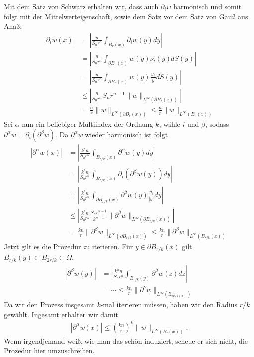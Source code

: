 \begin{solution}
Mit dem Satz von Schwarz erhalten wir, dass auch $\partial_i w$ harmonisch und
somit folgt mit der Mittelwerteigenschaft, sowie dem Satz vor dem Satz von Gauß aus Ana3:
\begin{align*}
  |\partial_iw(x)|
  &= \left|\frac{n}{S_nr^n}\int_{B_{r}(x)}\partial_iw(y) dy\right| \\
  &= \left|\frac{n}{S_nr^n}\int_{\partial B_{r}(x)}w(y)\nu_i(y) dS(y)\right| \\
  &= \left|\frac{n}{S_nr^n}\int_{\partial B_{r}(x)}w(y)\frac{y_i}{|y|} dS(y)\right| \\
  &\leq \left|\frac{n}{S_nr^n}S_nr^{n-1}\|w\|_{L^{\infty}(\partial B_{r}(x))}\right| \\
  &= \frac{n}{r}\|w\|_{L^{\infty}(\partial B_{r}(x))} \leq \frac{n}{r}\|w\|_{L^{\infty}(B_{r}(x))}
\end{align*}
Sei $\alpha$ nun ein beliebiger Multiindex der
Ordnung $k$, wähle $i$ und $\beta$, sodass
$\partial^{\alpha}w = \partial_i(\partial^{\beta}w)$. Da $\partial^{\alpha}w$
wieder harmonisch ist folgt
\begin{align*}
  |\partial^\alpha w(x)|
  &= \left|\frac{k^nn}{S_nr^n}\int_{B_{r/k}(x)}\partial^{\alpha}w(y) dy\right| \\
  &= \left|\frac{k^nn}{S_nr^n}\int_{B_{r/k}(x)}\partial_i(\partial^{\beta}w(y)) dy\right| \\
  &= \left|\frac{k^nn}{S_nr^n}\int_{\partial B_{r/k}(x)}\partial^{\beta}w(y)\frac{y_i}{|y|} dy\right| \\
  &\leq \left|\frac{k^nn}{S_nr^n}\frac{S_nr^{n-1}}{k^{n-1}}
  \|\partial^\beta w\|_{L^{\infty}(\partial B_{r/k}(x))}\right| \\
  &= \frac{kn}{r}\|\partial^\beta w\|_{L^{\infty}(\partial B_{r/k}(x))}
  \leq \frac{kn}{r}\|\partial^\beta w\|_{L^{\infty}( B_{r/k}(x))}
\end{align*}
Jetzt gilt es die Prozedur zu iterieren. Für $y \in \partial B_{r/k}(x)$
gilt $B_{r/k}(y) \subset B_{2r/k} \subset \Omega$.
\begin{align*}
  |\partial^{\beta}w(y)| &= \left|\frac{k^nn}{S_nr^n}\int_{B_{r/k}(y)}\partial^{\beta}w(z) dz\right| \\
  &= \cdots \leq \frac{kn}{r}\|\partial^{\gamma}w\|_{L^{\infty}(B_{2r/k(x)})}
\end{align*}
Da wir den Prozess insgesamt
$k$-mal iterieren müssen, haben wir den Radius $r/k$ gewählt. Ingesamt erhalten wir damit
\begin{align*}
  |\partial^{\alpha}w(x)| \leq \left(\frac{kn}{r}\right)^k\|w\|_{L^{\infty}(B_r(x))}.
\end{align*}
Wenn irgendjemand weiß, wie man das schön induziert, scheue er sich nicht,
die Prozedur hier umzuschreiben.
\end{solution}

